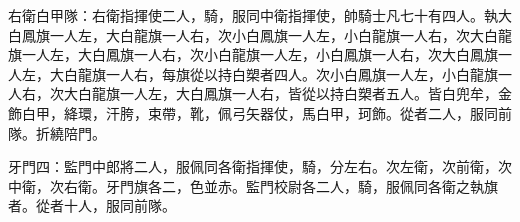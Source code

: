 \begin{pinyinscope}
 右衛白甲隊：右衛指揮使二人，騎，服同中衛指揮使，帥騎士凡七十有四人。執大白鳳旗一人左，大白龍旗一人右，次小白鳳旗一人左，小白龍旗一人右，次大白龍旗一人左，大白鳳旗一人右，次小白龍旗一人左，小白鳳旗一人右，次大白鳳旗一人左，大白龍旗一人右，每旗從以持白槊者四人。次小白鳳旗一人左，小白龍旗一人右，次大白龍旗一人左，大白鳳旗一人右，皆從以持白槊者五人。皆白兜牟，金飾白甲，絳環，汗胯，束帶，靴，佩弓矢器仗，馬白甲，珂飾。從者二人，服同前隊。折繞陪門。



 牙門四：監門中郎將二人，服佩同各衛指揮使，騎，分左右。次左衛，次前衛，次中衛，次右衛。牙門旗各二，色並赤。監門校尉各二人，騎，服佩同各衛之執旗者。從者十人，服同前隊。



\end{pinyinscope}